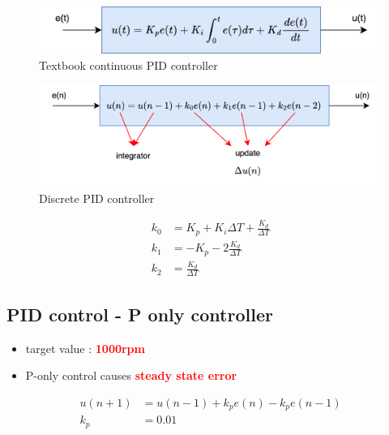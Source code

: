 \documentclass[12pt,twoside,onecolumn,openany,extrafontsizes,dvipsnames]{memoir}
\begin{document}
        \begin{figure}[!htb]
            \centering
            \includegraphics[scale=0.8]{../diagrams/control_generic/control_generic-pid.png}
            \caption{Textbook continuous PID controller}
            \label{fig:textbook_continuous_pid_controller}
        \end{figure}

        \begin{figure}[!htb]
            \centering
            \includegraphics[scale=0.8]{../diagrams/control_generic/control_generic-pid_discrete.png}
            \caption{Discrete PID controller }
            \label{fig:discrete_pid_controller}
        \end{figure}

        
        \begin{align}
            k_0 &= K_p + K_i\Delta T + \frac{K_d}{\Delta T} \\
            k_1 &= -K_p - 2\frac{K_d}{\Delta T} \\
            k_2 &= \frac{K_d}{\Delta T}
        \end{align}

            \newpage
            \subsection{PID control - P only controller}

                \begin{itemize}
                    \item  target value : \textcolor{red}{\textbf { 1000rpm}}
                    \item  P-only control causes \textcolor{red}{\textbf {steady state error}}
                \end{itemize}
            
                \begin{align}
                    u(n+1) &= u(n-1) + k_pe(n) - k_pe(n-1) \\
                    k_p    &= 0.01
                \end{align}
\end{document}
